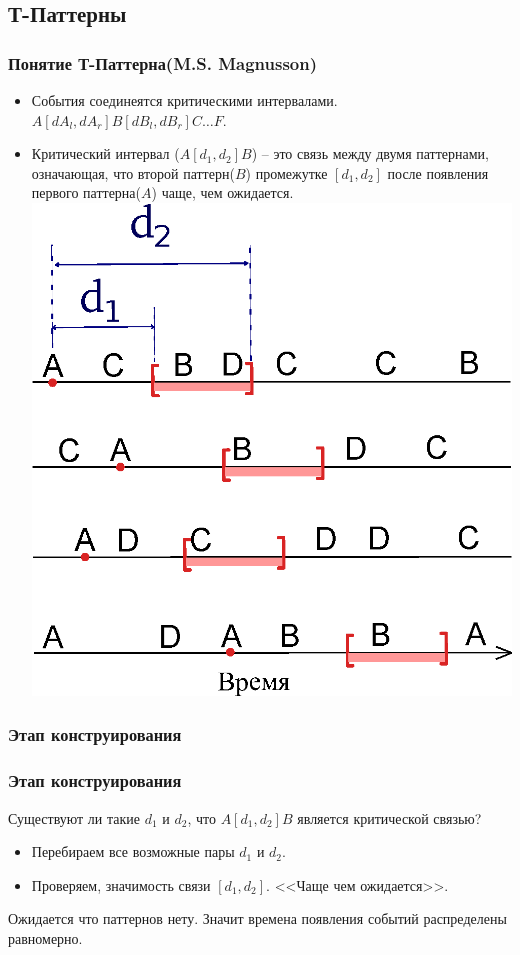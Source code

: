 \documentclass[smaller]{beamer}
\begin{document}
\subsection{Т-Паттерны}
\begin{frame}	
  \frametitle{Понятие Т-Паттерна(M.S. Magnusson)}
  \begin{itemize}
   \item События соединеятся критическими интервалами. $A[dA_l,dA_r]B[dB_l,dB_r]C\dots F$. 
   \item Критический интервал ($A[d_1,d_2]B$) -- это связь между двумя паттернами, означающая, что второй паттерн($B$) промежутке $[d_1,d_2]$ 
после появления первого паттерна($A$) чаще, чем ожидается.
\\ \includegraphics[scale=0.30]{TPTSn.eps} 
  \end{itemize}
\end{frame}

\subsubsection{Этап конструирования}
\begin{frame}	
  \frametitle{Этап конструирования}
    Существуют ли такие $d_1$ и $d_2$, что $A[d_1,d_2]B$ является критической связью?
\begin{itemize}
   \item Перебираем все возможные пары $d_1$ и $d_2$.
   \item Проверяем, значимость связи $[d_1, d_2]$. <<Чаще чем ожидается>>.
  \end{itemize}
  Ожидается что паттернов нету. Значит времена появления событий распределены равномерно.
\end{frame}
\end{document}

